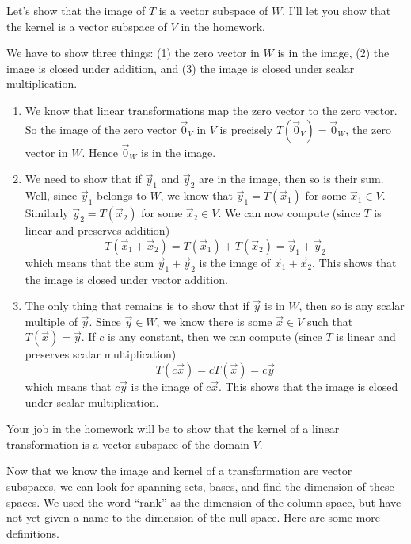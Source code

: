 \begin{example}
Let's show that the image of $T$ is a vector subspace of $W$. I'll let you show that the kernel is a vector subspace of $V$ in the homework.

We have to show three things: (1) the zero vector in $W$ is in the image, (2) the image is closed under addition, and (3) the image is closed under scalar multiplication.
\begin{enumerate}
	\item We know that linear transformations map the zero vector to the zero vector.  So the image of the zero vector $\vec 0_V$ in $V$ is precisely $T(\vec 0_V) = \vec 0_W$, the zero vector in $W$.  Hence $\vec 0_W$ is in the image.
	\item We need to show that if $\vec y_1$ and $\vec y_2$ are in the image, then so is their sum.  
	Well, since $\vec y_1$ belongs to $W$, we know that $\vec y_1 = T(\vec x_1)$ for some $\vec x_1\in V$.  
	Similarly $\vec y_2 = T(\vec x_2)$ for some $\vec x_2\in V$.  
	We can now compute (since $T$ is linear and preserves addition)   $$T(\vec x_1+\vec x_2) = T(\vec x_1)+T(\vec x_2) = \vec y_1+\vec y_2$$ 
	which means that the sum $\vec y_1+\vec y_2$ is the image of $\vec x_1+\vec x_2$. 
	This shows that the image is closed under vector addition.
	\item The only thing that remains is to show that if $\vec y$ is in $W$, then so is any scalar multiple of $\vec y$. Since $\vec y\in W$, we know there is some $\vec x\in V$ such that $T(\vec x)=\vec y$. 
	If $c$ is any constant, then we can compute (since $T$ is linear and preserves scalar multiplication) 
	$$T(c\vec x) = cT(\vec x) = c\vec y$$ which means that $c\vec y$ is the image of $c\vec x$.
	This shows that the image is closed under scalar multiplication.
	
\end{enumerate}

Your job in the homework will be to show that the kernel of a linear transformation is a vector subspace of the domain $V$.

\end{example}

Now that we know the image and kernel of a transformation are vector subspaces, we can look for spanning sets, bases, and find the dimension of these spaces. We used the word ``rank'' as the dimension of the column space, but have not yet given a name to the dimension of the null space.  Here are some more definitions.

